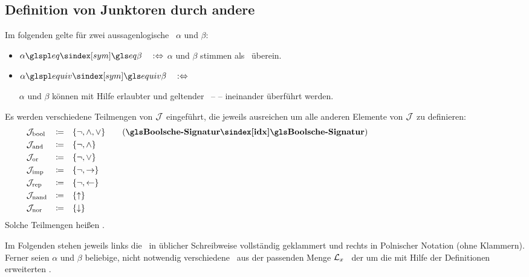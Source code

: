 \subsection{Definition von Junktoren durch andere}%
\label{sub:ausJunktorDef}

Im folgenden gelte für zwei aussagenlogische \Formeln\ $\alpha$ und $\beta$:
\begin{itemize}
	\item[] $\alpha \glsSym{eq}    \beta \quad \metadefeq$ \quad $\alpha$ und $\beta$
	stimmen als \Zeichenkette\ überein.
	\item[] $\alpha \glsSym{equiv} \beta \quad \metadefeq$ \quad
	\parbox[t]{13cm}{$\alpha$ und $\beta$ können mit Hilfe erlaubter  und geltender \Axiome\ --  -- ineinander überführt werden.}
\end{itemize}

Es werden verschiedene Teilmengen von $\mathcal{J}$ eingeführt, die jeweils ausreichen um alle anderen Elemente von $\mathcal{J}$ zu definieren:
\begin{align}
	& \alJun_\iBool & \defeq & \quad\{ \lnot, \land, \lor \} \label{def:Jbool}
	\qquad \text{(\defn{\BoolscheSignatur})}
	\\
	& \alJun_\iAnd  & \defeq & \quad\{ \lnot, \land       \} \label{def:Jand}
	\\
	& \alJun_\iOr   & \defeq & \quad\{ \lnot, \lor        \} \label{def:Jor}
	\\
	& \alJun_\iImp  & \defeq & \quad\{ \lnot, \limp       \} \label{def:Jimp}
	\\
	& \alJun_\iRep  & \defeq & \quad\{ \lnot, \lrep       \} \label{def:Jrep}
	\\
	& \alJun_\iNand & \defeq & \quad\{ \lnand             \} \label{def:Jnand}
	\\
	& \alJun_\iNor  & \defeq & \quad\{ \lnor              \} \label{def:Jnor}
	\formulatoleft\formulatoleft\formulatoleft
\end{align}
Solche Teilmengen heißen \logischeSignatur.

Im Folgenden stehen jeweils links die \Formeln\ in üblicher Schreibweise vollständig geklammert und rechts in Polnischer Notation (ohne Klammern).
Ferner seien $\alpha$ und $\beta$ beliebige, nicht notwendig verschiedene \Formeln\ aus der passenden Menge $\mathcal{L}_x$ \textbzgl\ der um die mit Hilfe der Definitionen erweiterten \Formelmenge.

